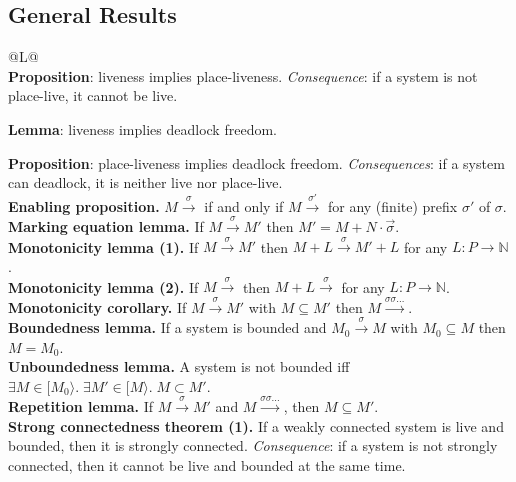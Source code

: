 \subsection{General Results}

\begin{tabularx}{\linewidth}{@{}L@{}}
\toprule
{}  \\
\midrule
\textbf{Proposition}: liveness implies place-liveness. \emph{Consequence}: if a system is not place-live, it cannot be live. \par \textbf{Lemma}: liveness implies deadlock freedom. \par \textbf{Proposition}: place-liveness implies deadlock freedom. \emph{Consequences}: if a system can deadlock, it is neither live nor place-live. \\
\midrule
\textbf{Enabling proposition.} $M \xrightarrow{\sigma}$ if and only if $M \xrightarrow{\sigma'}$ for any (finite) prefix $\sigma'$ of $\sigma$. \\
\midrule
\textbf{Marking equation lemma.} If $M \xrightarrow{\sigma} M'$ then $M' = M + N \cdot \vec\sigma$. \\
\midrule
\textbf{Monotonicity lemma (1).} If $M \xrightarrow{\sigma} M'$ then $M + L \xrightarrow{\sigma} M' + L$ for any $L : P \to \mathbb{N}$. \\
\midrule
\textbf{Monotonicity lemma (2).} If $M \xrightarrow{\sigma}$ then $M + L \xrightarrow{\sigma}$ for any $L : P \to \mathbb{N}$. \\
\midrule
\textbf{Monotonicity corollary.} If $M \xrightarrow{\sigma} M'$ with $M \subseteq M'$ then $M \xrightarrow{\sigma\sigma\ldots}$. \\
\midrule
\textbf{Boundedness lemma.} If a system is bounded and $M_0 \xrightarrow{\sigma} M$ with $M_0 \subseteq M$ then $M = M_0$. \\
\midrule
\textbf{Unboundedness lemma.} A system is not bounded iff $\exists M \in [M_0\rangle.\; \exists M' \in [M\rangle.\; M \subset M'$. \\
\midrule
\textbf{Repetition lemma.} If $M \xrightarrow{\sigma} M'$ and $M \xrightarrow{\sigma\sigma\ldots}$, then $M \subseteq M'$. \\
\midrule
\textbf{Strong connectedness theorem (1).} If a weakly connected system is live and bounded, then it is strongly connected. \emph{Consequence}: if a system is not strongly connected, then it cannot be live and bounded at the same time. \\

\end{tabularx}
